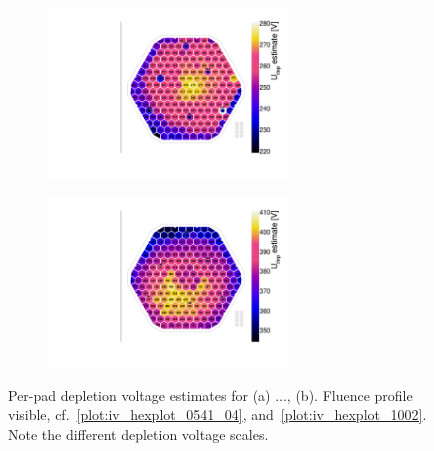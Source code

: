\begin{figure}
	\captionsetup[subfigure]{aboveskip=-1pt,belowskip=-1pt}
	\centering
	\begin{subfigure}[b]{0.49\textwidth}
		\centering
		\includegraphics[width=0.7\textwidth]{plots/Vdep_hexplots/0541_04.pdf}
		\subcaption{
			}
			\label{plot:Vdep_hexplot_0541_04}
	\end{subfigure}
	\hfill
	\begin{subfigure}[b]{0.49\textwidth}
		\centering
		\includegraphics[width=0.7\textwidth]{plots/Vdep_hexplots/1002.pdf}
		\subcaption{
		}
		\label{plot:Vdep_hexplot_1002}
	\end{subfigure}	
	\caption{
		Per-pad depletion voltage estimates for (a) ..., (b). 
		Fluence profile visible, cf.~\ref{plot:iv_hexplot_0541_04}, and~\ref{plot:iv_hexplot_1002}.
		Note the different depletion voltage scales.
	}
\end{figure}